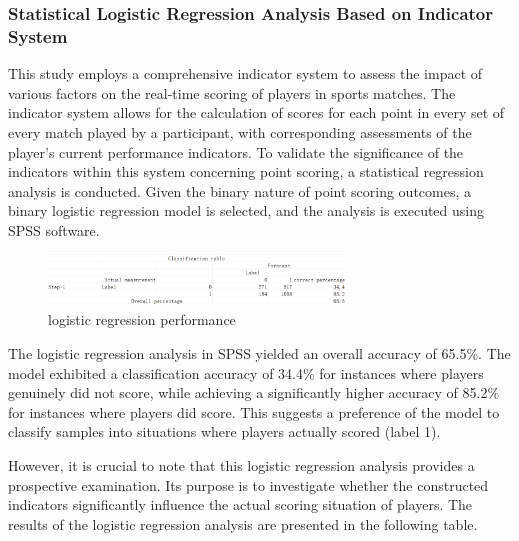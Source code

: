 \documentclass{article}
\begin{document}
\subsubsection{Statistical Logistic Regression Analysis Based on Indicator System}
This study employs a comprehensive indicator system to assess the impact of various factors on the real-time scoring of players in sports matches.
The indicator system allows for the calculation of scores for each point in every set of every match played by a participant, with corresponding assessments 
of the player's current performance indicators. To validate the significance of the indicators within this system concerning point scoring, a statistical regression analysis is conducted. 
Given the binary nature of point scoring outcomes, a binary logistic regression model is selected, and the analysis is executed using SPSS software.
\begin{figure}[H]
      \centering
      \includegraphics[width=0.7\textwidth]{logistic_classfication_1.png}
      \caption{logistic regression performance}
\end{figure}
The logistic regression analysis in SPSS yielded an overall accuracy of 65.5\%. The model exhibited a classification accuracy of 34.4\%
for instances where players genuinely did not score, while achieving a significantly higher accuracy of 85.2\% for instances where players did score. 
This suggests a preference of the model to classify samples into situations where players actually scored (label 1).

However, it is crucial to note that this logistic regression analysis provides a prospective examination. Its purpose is to investigate 
whether the constructed indicators significantly influence the actual scoring situation of players. The results of the logistic regression analysis are presented in the following table.
\end{document}
